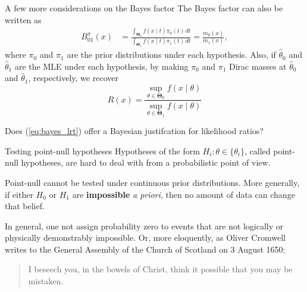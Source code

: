\begin{frame}{A few more considerations on the Bayes factor}
The Bayes factor can also be written as 
\begin{align*}
  B^\pi_{01}(x) &=  \frac{\int_{\boldsymbol{\Theta}_0} f(x\mid t)\pi_0(t)\,dt }{\int_{\boldsymbol{\Theta}_1} f(x\mid t)\pi_1(t)\,dt} = \frac{m_0(x)}{m_1(x)},
\end{align*}
where $\pi_0$ and $\pi_1$ are the prior distributions under each hypothesis.
Also, if $\hat{\theta}_0$ and $\hat{\theta}_1$ are the MLE under each hypothesis, by making $\pi_0$ and $\pi_1$ Dirac masses at $\hat{\theta}_0$ and $\hat{\theta}_1$, respectively, we recover
\begin{equation}
\label{eq:bayes_lrt}
 R(x) = \frac{\sup_{\theta \in \boldsymbol{\Theta}_0}f(x \mid \theta)}{\sup_{\theta \in \boldsymbol{\Theta}_1}f(x \mid \theta)}
\end{equation}
\begin{exercise}
 Does (\ref{eq:bayes_lrt}) offer a Bayesian justifcation for likelihood ratios?
\end{exercise}
\end{frame}
\begin{frame}{Testing point-null hypotheses}
Hypotheses of the form $H_i : \theta \in \{ \theta_i \}$, called point-null hypotheses, are hard to deal with from a probabilistic point of view.
\begin{remark}
 Point-null cannot be tested under continuous prior distributions.
 More generally, if either $H_0$ or $H_1$ are \textbf{impossible} \textit{a priori}, then no amount of data can change that belief.
\end{remark}
\begin{idea}
 In general, one not assign probability zero to events that are not logically or physically demonstrably impossible.
 Or, more eloquently, as  Oliver Cromwell writes to the General Assembly of the Church of Scotland on 3 August 1650:
 \begin{quotation}
  I beseech you, in the bowels of Christ, think it possible that you may be mistaken.
 \end{quotation}
\end{idea} 
\end{frame}
